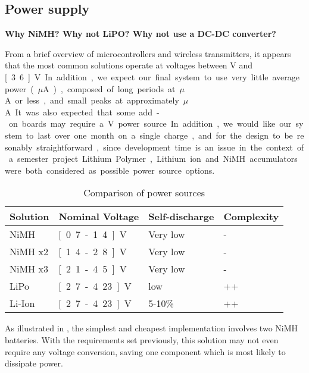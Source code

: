 \subsection{Power supply}
\label{sub:power-supply}
\textbf{Why NiMH? Why not LiPO? Why not use a DC-DC converter?}

From a brief overview of microcontrollers and wireless transmitters, it appears
that the most common solutions operate at voltages between \unit[2]{V} and
\unit[3.6]{V}. In addition, we expect our final system to use very little
average power (\unit[1-10]{$\mu$A}), composed of long periods at
\unit[1]{$\mu$A} or less, and small peaks at approximately \unit[50]{$\mu$A}. It
was also expected that some add-on boards may require a \unit[5]{V} power
source.

In addition, we would like our system to last over one month on a single charge, 
and for the design to be resonably straightforward, since development time is an
issue in the context of a semester project.

Lithium Polymer, Lithium ion and NiMH accumulators were both considered as
possible power source options. 

\begin{table}
  \centering
  \begin{tabular}{l|l|l|l}
    Solution	& Nominal Voltage	& Self-discharge	& Complexity \\
    \hline
    NiMH 	& \unit[0.7-1.4]{V}	& Very low		& -	     \\
    NiMH x2 	& \unit[1.4-2.8]{V}	& Very low		& -	     \\
    NiMH x3 	& \unit[2.1-4.5]{V}	& Very low		& -	     \\
    LiPo 	& \unit[2.7-4.23]{V}	& low			& ++	     \\
    Li-Ion 	& \unit[2.7-4.23]{V}	& 5-10\%		& ++	     \\
  \end{tabular}
  \caption{Comparison of power sources}
  \label{tab:battery-comparison}
\end{table}

As illustrated in , the simplest and cheapest
implementation involves two NiMH batteries. With the requirements set
previously, this solution may not even require any voltage conversion, saving
one component which is most likely to dissipate power.

